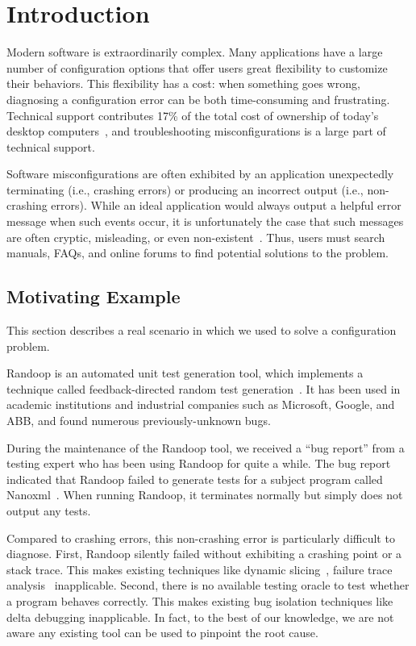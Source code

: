 
\section{Introduction}
\label{sec:introduction}

Modern software is extraordinarily complex. Many applications have a large
number of configuration options that offer users great flexibility to
customize their behaviors. This flexibility has a cost: when something
goes wrong, diagnosing a configuration error can be both time-consuming
and frustrating. Technical support contributes 17\% of the total cost of ownership of
today's desktop computers~\cite{confevidence}, and troubleshooting misconfigurations
is a large part of technical support.

Software misconfigurations are often exhibited by an application unexpectedly terminating
(i.e., crashing errors) or producing an incorrect output (i.e., non-crashing errors). While an ideal application would always
output a helpful error message when such events occur, it is unfortunately
the case that such messages are often cryptic, misleading, or
even non-existent~\cite{Yin:2011:ESC, Attariyan:2010:ACT, Hubaux:2012, rangefix}.
Thus, users must search manuals, FAQs, and online forums to find potential
solutions to the problem. %

\subsection{Motivating Example}

This section describes a real scenario in which we used \ourtool to solve
a configuration problem.

Randoop is an automated unit test generation tool, which implements
a technique called feedback-directed random test generation~\cite{randoop}.
It has been used in academic institutions and
industrial companies such as Microsoft, Google,
and ABB, and found numerous previously-unknown bugs.

During the maintenance of the Randoop tool, we received a ``bug report''
from a testing expert who has been using Randoop for quite a while.
The bug report indicated that Randoop failed to generate
tests for a subject program called Nanoxml~\cite{nanoxml}. When running Randoop,
it terminates normally but simply does not output any tests.

Compared to crashing errors, this non-crashing error is particularly difficult to diagnose.
First, Randoop silently failed without exhibiting a crashing point or
a stack trace. This makes existing techniques like dynamic slicing~\cite{Zhang:2003:PDS},
failure trace analysis~\cite{Rabkin:2011:PPC, Attariyan:2010:ACT} inapplicable. Second, there is no
available testing oracle to test whether a program behaves correctly.
This makes existing bug isolation techniques like delta debugging
inapplicable. In fact, to the best of our knowledge, we are not
aware any existing tool can be used to pinpoint the root cause.

